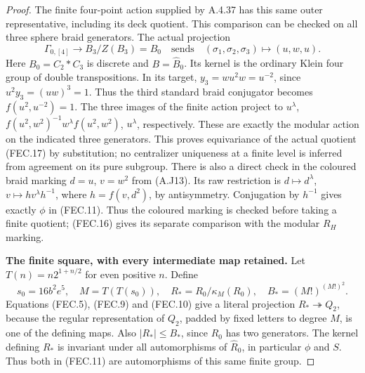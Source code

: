 \begin{proof}
The finite four-point action supplied by A.4.37 has
this same outer representative, including its deck
quotient.  This comparison can be checked on all
three sphere braid generators.  The actual projection
\[
 \Gamma_{0,[4]}\longrightarrow B_3/Z(B_3)=B_0
 \quad\text{sends}\quad
       (\sigma_1,\sigma_2,\sigma_3)\longmapsto(u,w,u).
                                                               \tag{FEC.17}
\]
Here $B_0=C_2*C_3$ is discrete and $B=\widehat B_0$.
Its kernel is the ordinary Klein four group of double
transpositions.  In its target,
$y_3=w u^2 w=u^{-2}$, since
$u^2y_3=(uw)^3=1$.  Thus the third standard braid
conjugator becomes $f(u^2,u^{-2})=1$.  The three
images of the finite action project to
$u^\lambda$, $f(u^2,w^2)^{-1}w^\lambda f(u^2,w^2)$,
$u^\lambda$, respectively.  These are exactly the
modular action on the indicated three generators.
This proves equivariance of the actual quotient
(FEC.17) by substitution; no centralizer uniqueness
at a finite level is inferred from agreement on its
pure subgroup.  There is also a direct check in the coloured braid marking
$d=u$, $v=w^2$ from (A.J13).  Its raw restriction is
$d\mapsto d^\lambda$, $v\mapsto h v^\lambda h^{-1}$,
where $h=f(v,d^2)$, by antisymmetry.  Conjugation by
$h^{-1}$ gives exactly $\phi$ in (FEC.11).  Thus the
coloured marking is checked before taking a finite
quotient; (FEC.16) gives its separate comparison with
the modular $R_H$ marking.

\par\medskip\noindent\textbf{The finite square, with every intermediate map retained.}\quad
Let $T(n)=n2^{1+n/2}$ for even positive $n$.  Define
\[
 s_0=16b^2e^5,\quad M=T(T(s_0)),\quad
 R_* =R_0/\kappa_M(R_0),\quad
 B_*=(M!)^{(M!)^2}.
                                                               \tag{FEC.18}
\]
Equations (FEC.5), (FEC.9) and (FEC.10) give a literal
projection $R_*\twoheadrightarrow Q_2$, because the
regular representation of $Q_2$, padded by fixed
letters to degree $M$, is one of the defining maps.
Also $|R_*|\leq B_*$, since $R_0$ has two generators.
The kernel defining $R_*$ is invariant under all
automorphisms of $\widehat R_0$, in particular $\phi$
and $S$.  Thus both in (FEC.11) are automorphisms
of this same finite group.


\end{proof}
